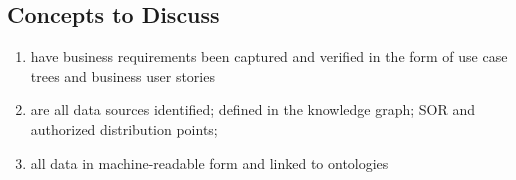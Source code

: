 \subsection*{Concepts to Discuss}

\begin{enumerate}

  \item have business requirements been captured and verified in the form of use case trees and business user stories
  \item are all data sources identified; defined in the knowledge graph; SOR and authorized distribution points;
  \item all data in machine-readable form and linked to ontologies

\end{enumerate}
